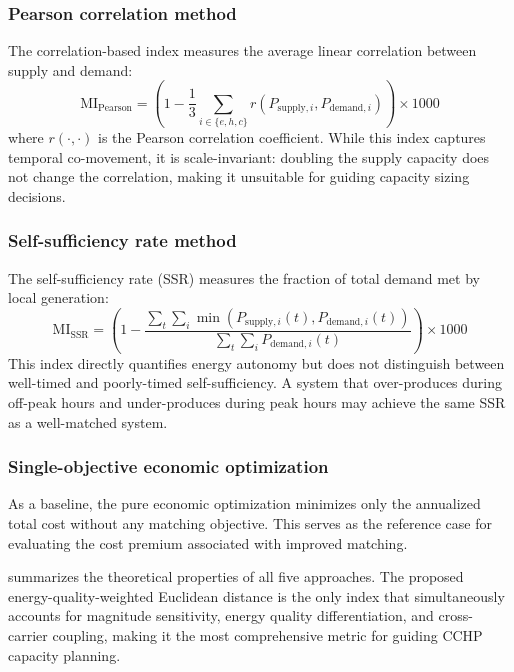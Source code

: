 \subsubsection{Pearson correlation method}

The correlation-based index measures the average linear correlation between supply and demand:
\begin{equation}
    \text{MI}_{\text{Pearson}} = \left(1 - \frac{1}{3}\sum_{i \in \{e,h,c\}} r(P_{\text{supply},i}, P_{\text{demand},i})\right) \times 1000
    \label{eq:mi_pearson}
\end{equation}
where $r(\cdot,\cdot)$ is the Pearson correlation coefficient. While this index captures temporal co-movement, it is scale-invariant: doubling the supply capacity does not change the correlation, making it unsuitable for guiding capacity sizing decisions.

\subsubsection{Self-sufficiency rate method}

The self-sufficiency rate (SSR) measures the fraction of total demand met by local generation:
\begin{equation}
    \text{MI}_{\text{SSR}} = \left(1 - \frac{\sum_{t}\sum_{i} \min(P_{\text{supply},i}(t), P_{\text{demand},i}(t))}{\sum_{t}\sum_{i} P_{\text{demand},i}(t)}\right) \times 1000
    \label{eq:mi_ssr}
\end{equation}
This index directly quantifies energy autonomy but does not distinguish between well-timed and poorly-timed self-sufficiency. A system that over-produces during off-peak hours and under-produces during peak hours may achieve the same SSR as a well-matched system.

\subsubsection{Single-objective economic optimization}

As a baseline, the pure economic optimization minimizes only the annualized total cost without any matching objective. This serves as the reference case for evaluating the cost premium associated with improved matching.

 summarizes the theoretical properties of all five approaches. The proposed energy-quality-weighted Euclidean distance is the only index that simultaneously accounts for magnitude sensitivity, energy quality differentiation, and cross-carrier coupling, making it the most comprehensive metric for guiding CCHP capacity planning.


